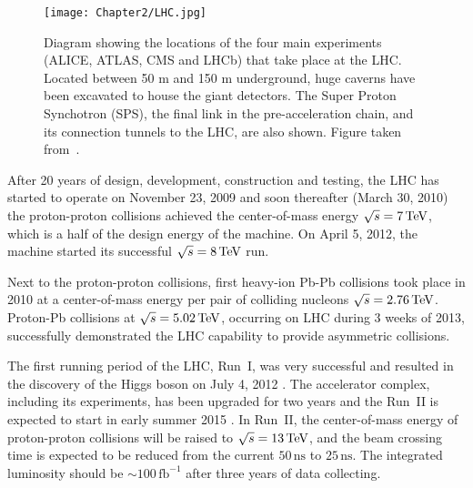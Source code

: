 \begin{figure}[t]
  \centering
  \texttt{[image: Chapter2/LHC.jpg]}
  \caption[Diagram showing the locations of the four main experiments (ALICE,
          ATLAS, CMS and LHCb) that take place at the LHC. Located between 50 m and
          150 m underground, huge caverns have been excavated to house the giant
          detectors. The Super Proton Synchotron (SPS), the final link in the
          pre-acceleration chain, and its connection tunnels to the LHC, are also
          shown.]
          {Diagram showing the locations of the four main experiments (ALICE,
          ATLAS, CMS and LHCb) that take place at the LHC. Located between 50 m and
          150 m underground, huge caverns have been excavated to house the giant
          detectors. The Super Proton Synchotron (SPS), the final link in the
          pre-acceleration chain, and its connection tunnels to the LHC, are also
          shown.  Figure taken from~\cite{CERN:ATLASexperimentPictureswiki}.  }
  \label{fig:LHC}
\end{figure}

After 20 years of design, development, construction and testing, the LHC has
started to operate on November 23, 2009 and soon thereafter (March 30, 2010) the
proton-proton collisions achieved the center-of-mass energy $\sqrt{s} = 7 \,\text{TeV}$,
which is a half of the design energy of the machine. On April 5, 2012, the
machine started its successful $\sqrt{s} = 8 \,\text{TeV}$ run.

Next to the proton-proton collisions, first heavy-ion Pb-Pb collisions took place
in 2010 at a center-of-mass energy per pair of colliding nucleons $\sqrt{s} =
2.76 \,\text{TeV}$. Proton-Pb collisions at $\sqrt{s} = 5.02 \,\text{TeV}$, occurring on LHC
during 3 weeks of 2013, successfully demonstrated the LHC capability to provide
asymmetric collisions.  

The first running period of the LHC, Run~I, was very successful and resulted in
the discovery of the Higgs boson on July 4, 2012 \cite{HiggsDiscovery}.  The
accelerator complex, including its experiments, has been upgraded for two years
and the Run~II is expected to start in early summer 2015 \cite{LHCFuture,
LHCFutureLuminosigy}. In Run~II, the center-of-mass energy of proton-proton
collisions will be raised to $\sqrt{s} = 13 \,\text{TeV}$, and the beam crossing time
is expected to be reduced from the current $50\,\text{ns}$ to $25\,\text{ns}$. The
integrated luminosity should be $\sim 100\,\text{fb}^{-1}$ after three years of
data collecting.


